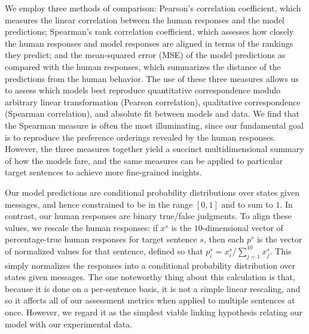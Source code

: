 \documentclass[leqno,12pt]{article}
\begin{document}
{We employ three methods of comparison: Pearson's correlation
coefficient, which measures the linear correlation between the human
responses and the model predictions; Spearman's rank correlation
coefficient, which assesses how closely the human responses and model
responses are aligned in terms of the rankings they predict; and the
mean-squared error (MSE) of the model predictions as compared with the
human responses, which summarizes the distance of the predictions from
the human behavior. The use of these three measures allows us to
assess which models best reproduce quantitative correspondence modulo
arbitrary linear transformation (Pearson correlation), qualitative
correspondence (Spearman correlation), and absolute fit between models
and data. We find that the Spearman measure is often the most
illuminating, since our fundamental goal is to reproduce the
preference orderings revealed by the human responses.  However, the
three measures together yield a succinct multidimensional summary of
how the models fare, and the same measures can be applied to
particular target sentences to achieve more fine-grained insights.

Our model predictions are conditional probability distributions over
states given messages, and hence constrained to be in the range
$[0,1]$ and to sum to $1$. In contrast, our human responses are binary
true/false judgments. To align these values, we rescale the human
responses: if $x^{s}$ is the $10$-dimensional vector of
percentage-true human responses for target sentence $s$, then each
$p^{s}$ is the vector of normalized values for that sentence, defined
so that $p^{s}_{i} = x^{s}_{i}/\sum_{j=1}^{10}x^{s}_{j}$. This
simply normalizes the responses into a conditional probability
distribution over states given messages. The one noteworthy thing
about this calculation is that, because it is done on a per-sentence
basis, it is not a simple linear rescaling, and so it affects all of
our assessment metrics when applied to multiple sentences at
once. However, we regard it as the simplest viable linking hypothesis
relating our model with our experimental data.

}
\end{document}
